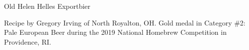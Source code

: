 \begin{recipe}{Old Helen Helles Exportbier}

\begin{aboutblock}
Recipe by Gregory Irving of North Royalton, OH. Gold medal in Category \#2: Pale
European Beer during the 2019 National Homebrew Competition in Providence, RI.
\sourceaha
\end{aboutblock}


\begin{methodandtiming}
 
\begin{mashsteps}
\end{mashsteps}

\begin{fermentationsteps}
\end{fermentationsteps}

\end{methodandtiming}

\recipebreak

\begin{ingredientsblock}

\begin{malts}
\end{malts}

\begin{hops}
\end{hops}


\end{ingredientsblock}

\end{recipe}
